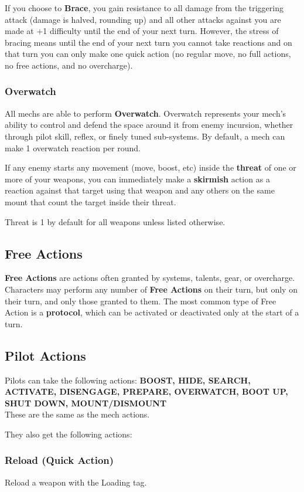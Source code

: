 If you choose to \textbf{Brace}, you gain resistance to all damage from the triggering attack (damage is halved, rounding up) and all other attacks against you are made at +1 difficulty until the end of your next turn. However, the stress of bracing means until the end of your next turn you cannot take reactions and on that turn you can only make one quick action (no regular move, no full actions, no free actions, and no overcharge).

\subsubsection{Overwatch}
All mechs are able to perform \textbf{Overwatch}. Overwatch represents your mech’s ability to control and defend the space around it from enemy incursion, whether through pilot skill, reflex, or finely tuned sub-systems. By default, a mech can make 1 overwatch reaction per round.

If any enemy starts any movement (move, boost, etc) inside the \textbf{threat} of one or more of your weapons, you can immediately make a \textbf{skirmish} action as a reaction against that target using that weapon and any others on the same mount that count the target inside their threat.

Threat is 1 by default for all weapons unless listed otherwise.

\subsection{Free Actions}
\textbf{Free Actions} are actions often granted by systems, talents, gear, or overcharge. Characters may perform any number of \textbf{Free Actions} on their turn, but only on their turn, and only those granted to them. The most common type of Free Action is a \textbf{protocol}, which can be activated or deactivated only at the start of a turn.

\subsection{Pilot Actions}
Pilots can take the following actions: \textbf{BOOST, HIDE, SEARCH, ACTIVATE, DISENGAGE,  PREPARE, OVERWATCH, BOOT UP, SHUT DOWN, MOUNT/DISMOUNT}\\
These are the same as the mech actions.

They also get the following actions:

\subsubsection{Reload (Quick Action)}
Reload a weapon with the Loading tag.

